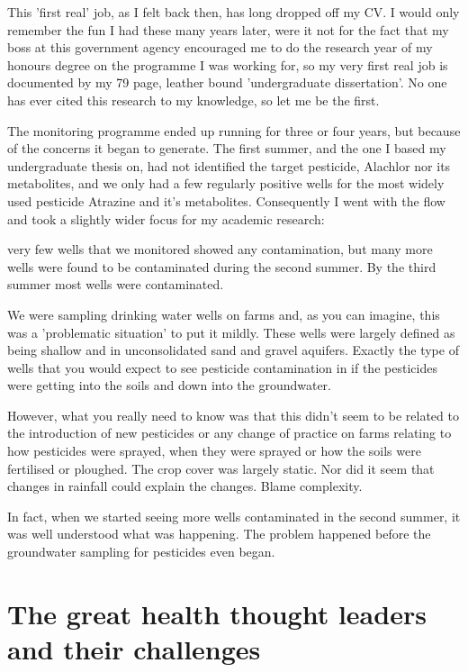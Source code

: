This 'first real' job, as I felt back then, has long dropped off my CV. I would only remember the fun I had these many years later, were it not for the fact that my boss at this government agency encouraged me to do the research year of my honours degree on the programme I was working for, so my very first real job is documented by my 79 page, leather bound 'undergraduate dissertation'. No one has ever cited this research to my knowledge, so let me be the first\cite{Skelly1988}.

The monitoring programme ended up running for three or four years, but  because of the concerns it began to generate. The first summer, and the one I based my undergraduate thesis on, had not identified the target pesticide, Alachlor nor its metabolites, and we only had a few regularly positive wells for the most widely used pesticide Atrazine and it's metabolites. Consequently I went with the flow and took a slightly wider focus for my academic research: 

 very few wells that we monitored showed any contamination, but many more wells were found to be contaminated during the second summer. By the third summer most wells were contaminated. 

We were sampling drinking water wells on farms and, as you can imagine, this was a 'problematic situation' to put it mildly. These wells were largely defined as being shallow and in unconsolidated sand and gravel aquifers. Exactly the type of wells that you would expect to see pesticide contamination in if the pesticides were getting into the soils and down into the groundwater. 

However, what you really need to know was that this didn't seem to be related to the introduction of new pesticides or any change of practice on farms relating to how pesticides were sprayed, when they were sprayed or how the soils were fertilised or ploughed. The crop cover was largely static. Nor did it seem that changes in rainfall could explain the changes. Blame complexity.

In fact, when we started seeing more wells contaminated in the second summer, it was well understood what was happening. The problem happened before the groundwater sampling for pesticides even began.

\section*{The great health thought leaders and their challenges}

